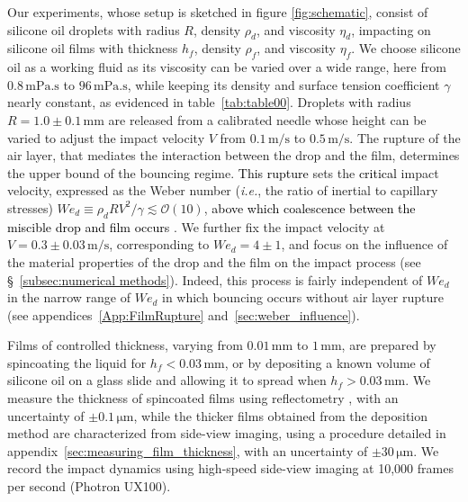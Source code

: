 \documentclass[]{jfm}
\newcommand{\revRev}[1]{\textcolor{black}{#1}}
\newcommand{\Wen}{\mathit{We}_\mathit{d}}
\begin{document}
	Our experiments, whose setup is sketched in figure \ref{fig:schematic}, consist of silicone oil droplets with radius $R$, density $\rho_d$, and viscosity $\eta_d$, impacting on silicone oil films with thickness $h_f$, density $\rho_f$, and viscosity $\eta_f$. 
	We choose silicone oil as a working fluid as its viscosity can be varied over a wide range, here from $0.8\,\si{\milli\pascal}.\si{\second}$ to $96\,\si{\milli\pascal}.\si{\second}$, while keeping its density and surface tension coefficient $\gamma$ nearly constant, as evidenced in table~\ref{tab:table00}. 
	Droplets with radius $R = 1.0 \pm 0.1\,\si{\milli\meter}$ are released from a calibrated needle whose height can be varied to adjust the impact velocity $V$ from $0.1\,\si{\meter}/\si{\second}$ to $0.5\,\si{\meter}/\si{\second}$. 
	The rupture of the air layer, that mediates the interaction between the drop and the film, determines the upper bound of the bouncing regime.
	\revRev{This rupture} sets the \revRev{critical} impact velocity, expressed as the Weber number ({\it i.e.}, the ratio of inertial to capillary stresses) $\Wen \equiv \rho_d R V^{2} /\gamma \lesssim \mathcal{O}\left(10\right)$, \revRev{above which coalescence between the miscible drop and film occurs} \citep[see appendix~\ref{App:FilmRupture} and][]{SprittlesPhysRevLett.124.084501, sharma2021regimes}. 
	We further fix the impact velocity at $V = 0.3 \pm 0.03\,\si{\meter}/\si{\second}$, corresponding to $\Wen = 4\pm1$, and focus on the influence of the material properties of the drop and the film on the impact process (see \S~\ref{subsec:numerical methods}). Indeed, this process is fairly independent of $\Wen$ in the narrow range of $\Wen$ in which bouncing occurs without air layer rupture (see appendices~\ref{App:FilmRupture} and~\ref{sec:weber_influence}).  
	
	Films of controlled thickness, varying from $0.01\,\si{\milli\meter}$ to $1\,\si{\milli\meter}$, are prepared by spincoating the liquid for $h_f < 0.03\,\si{\milli\meter}$, or by depositing a known volume of silicone oil on a glass slide and allowing it to spread when $h_f > 0.03\,\si{\milli\meter}$.  We measure the thickness of spincoated films using reflectometry \citep{reizman1965optical}, with an uncertainty of $\pm 0.1\,\si{\micro\meter}$, while the thicker films obtained from the deposition method are characterized from side-view imaging, using a procedure detailed in appendix~\ref{sec:measuring_film_thickness}, with an uncertainty of $\pm 30\,\si{\micro\meter}$. We record the impact dynamics using high-speed side-view imaging at 10,000 frames per second (Photron UX100).
	
\end{document}
